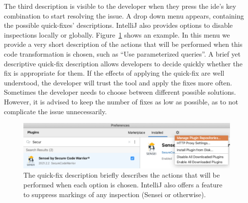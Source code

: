 The third description is visible to the developer when they press the \gls{ide}’s key combination to start resolving the issue.
A drop down menu appears, containing the possible quick-fixes' descriptions.
IntelliJ also provides options to disable inspections locally or globally. Figure~\ref{fig:qfdescription} shows an example.
In this menu we provide a very short description of the actions that will be performed when this code transformation is chosen, such as “Use parameterized queries”.
A brief yet descriptive quick-fix description allows developers to decide quickly whether the fix is appropriate for them.
If the effects of applying the quick-fix are well understood, the developer will trust the tool and apply the fixes more often.
Sometimes the developer needs to choose between different possible solutions.
However, it is advised to keep the number of fixes as low as possible, as to not complicate the issue unnecessarily.

\begin{figure}[t]
  \centering
  \includegraphics[width=\textwidth,page=5]{04-tools/figures/figures2.pdf}
  \caption[Example of the quick-fix description.]{The quick-fix description briefly describes the actions that will be performed when each option is chosen. IntelliJ also offers a feature to suppress markings of any inspection (Sensei or otherwise).}
  \label{fig:qfdescription} 
\end{figure}
